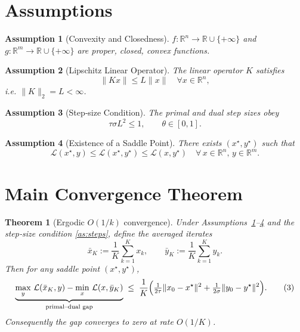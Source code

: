 \documentclass{article}
\newtheorem{theorem}{Theorem}
\newtheorem{assumption}{Assumption}
\begin{document}
\section*{Assumptions}
\begin{assumption}[Convexity and Closedness]\label{as:convex}
$f:\mathbb R^{n}\to\mathbb R\cup\{+\infty\}$ and $g:\mathbb R^{m}\to\mathbb R\cup\{+\infty\}$ are proper,
closed, convex functions.
\end{assumption}
\begin{assumption}[Lipschitz Linear Operator]\label{as:K}
The linear operator $K$ satisfies
\[
\|Kx\|\leq L\|x\|\quad\forall x\in\mathbb R^{n},
\]
i.e. $\|K\|_{2}=L<\infty$.
\end{assumption}
\begin{assumption}[Step‑size Condition]\label{as:steps}
The primal and dual step sizes obey
\[
\tau\sigma L^{2}\leq 1,\qquad \theta\in[0,1].
\]
\end{assumption}
\begin{assumption}[Existence of a Saddle Point]\label{as:saddle}
There exists $(x^{\star},y^{\star})$ such that
\[
\mathcal L(x^{\star},y)\leq\mathcal L(x^{\star},y^{\star})\leq\mathcal L(x,y^{\star})
\quad\forall\,x\in\mathbb R^{n},\,y\in\mathbb R^{m}.
\]
\end{assumption}

\section*{Main Convergence Theorem}
\begin{theorem}[Ergodic $O(1/k)$ convergence]\label{thm:ergodic}
Under Assumptions~\ref{as:convex}–\ref{as:saddle} and the step‑size condition
\eqref{as:steps}, define the averaged iterates
\[
\bar x_{K}:=\frac{1}{K}\sum_{k=1}^{K}x_{k},\qquad
\bar y_{K}:=\frac{1}{K}\sum_{k=1}^{K}y_{k}.
\]
Then for any saddle point $(x^{\star},y^{\star})$,
\[
\underbrace{\max_{y}\,\mathcal L(\bar x_{K},y)-\min_{x}\,\mathcal L(x,\bar y_{K})}_{\text{primal–dual gap}}
\;\le\;
\frac{1}{K}\Bigl(\tfrac{1}{2\tau}\|x_{0}-x^{\star}\|^{2}
+\tfrac{1}{2\sigma}\|y_{0}-y^{\star}\|^{2}\Bigr).
\tag{3}
\]
Consequently the gap converges to zero at rate $O(1/K)$.
\end{theorem}
\end{document}
